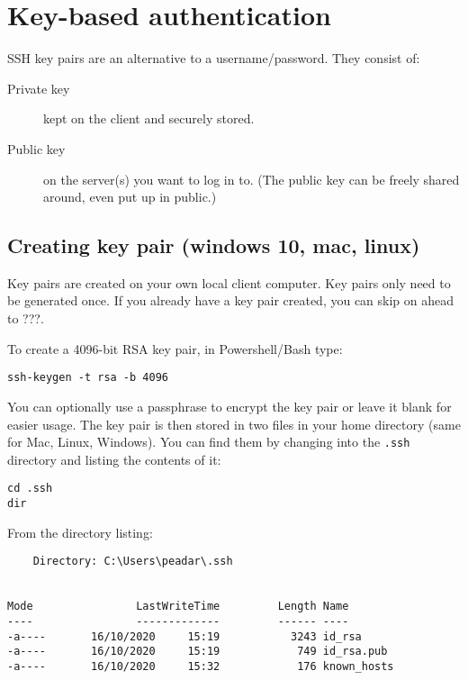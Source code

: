 \section{Key-based authentication}
\label{key-based-authentication}

SSH key pairs are an alternative to a username/password. They consist
of:

\begin{description}
\item[Private key]
kept on the client and securely stored.
\item[Public key]
on the server(s) you want to log in to. (The public key can be freely
shared around, even put up in public.)
\end{description}

\subsection{Creating key pair (windows 10, mac, linux)}
\label{sec:creating-key-pair}

Key pairs are created on your own local client computer.
Key pairs only need to be generated once.
If you already have a key pair created, you can skip on ahead to ???.

To create a 4096-bit RSA key pair, in Powershell/Bash type:

\begin{verbatim}
ssh-keygen -t rsa -b 4096
\end{verbatim}

You can optionally use a passphrase to encrypt the key pair or leave it blank for easier usage.
The key pair is then stored in two files in your home directory (same for Mac, Linux, Windows).
You can find them by changing into the \texttt{.ssh} directory and listing the contents of it:

\begin{verbatim}
cd .ssh
dir
\end{verbatim}

From the directory listing:

\begin{verbatim}
    Directory: C:\Users\peadar\.ssh


Mode                LastWriteTime         Length Name
----                -------------         ------ ----
-a----       16/10/2020     15:19           3243 id_rsa
-a----       16/10/2020     15:19            749 id_rsa.pub
-a----       16/10/2020     15:32            176 known_hosts
\end{verbatim}

